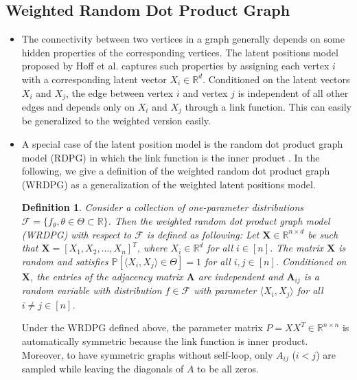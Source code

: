 \documentclass[a4paper]{article}
\newtheorem{definition}[fact]{Definition}
\begin{document}
\subsection{Weighted Random Dot Product Graph}
\label{section:WRDPG}
\begin{itemize}
\item The connectivity between two vertices in a graph generally depends on some hidden properties of the corresponding vertices. The latent positions model proposed by Hoff et al. \cite{hoff2002latent} captures such properties by assigning each vertex $i$ with a corresponding latent vector $X_i \in \mathbb{R}^d$. Conditioned on the latent vectors $X_i$ and $X_j$, the edge between vertex $i$ and vertex $j$ is independent of all other edges and depends only on $X_i$ and $X_j$ through a link function. This can easily be generalized to the weighted version easily.
\item A special case of the latent position model is the random dot product graph model (RDPG) in which the link function is the inner product \cite{young2007random, nickel2007random}. In the following, we give a definition of the weighted random dot product graph (WRDPG) as a generalization of the weighted latent positions model.
\begin{definition}
Consider a collection of one-parameter distributions $\mathcal{F} = \{ f_{\theta}, \theta \in \Theta \subset \mathbb{R} \}$. Then the weighted random dot product graph model (WRDPG) with respect to $\mathcal{F}$ is defined as following: Let $\boldsymbol{X} \in \mathbb{R}^{n \times d}$ be such that $\boldsymbol{X} = [X_1, X_2, \dotsc, X_n]^T$, where $X_i \in \mathbb{R}^d$ for all $i \in [n]$. The matrix $\boldsymbol{X}$ is random and satisfies $\mathbb{P}\left[ \langle X_i, X_j \rangle \in \Theta \right] = 1$ for all $i, j \in [n]$. Conditioned on $\boldsymbol{X}$, the entries of the adjacency matrix $\boldsymbol{A}$ are independent and $\boldsymbol{A}_{ij}$ is a random variable with distribution $f \in \mathcal{F}$ with parameter $\langle X_i, X_j \rangle$ for all $i \ne j \in [n]$.
\end{definition}
Under the WRDPG defined above, the parameter matrix $P = X X^T \in \mathbb{R}^{n \times n}$ is automatically symmetric because the link function is inner product. Moreover, to have symmetric graphs without self-loop, only $A_{ij}$ ($i < j$) are sampled while leaving the diagonals of $A$ to be all zeros.


\end{itemize}
\end{document}
